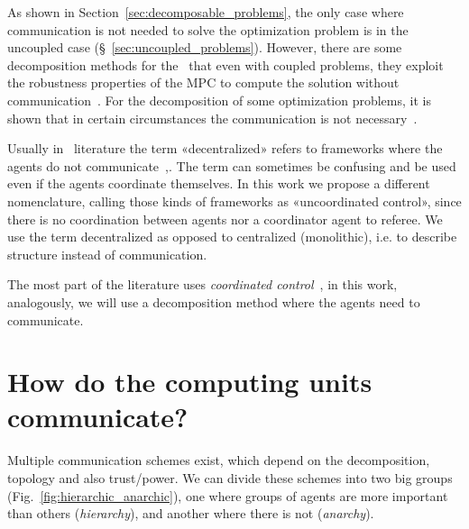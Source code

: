 \documentclass[../main.tex]{subfiles}
\begin{document}
As shown in Section~\ref{sec:decomposable_problems}, the only case where communication is not needed to solve the optimization problem is in the uncoupled case (\S~\ref{sec:uncoupled_problems}).
However, there are some decomposition methods for the \dmpc\ that even with coupled problems, they exploit the robustness properties of the MPC to compute the solution without communication~\cite{VahidNaghaviEtAl2014}.
For the decomposition of some optimization problems, it is shown that in certain circumstances the communication is not necessary~\cite{VoulgarisElia2022}.
\begin{remark}
  Usually in \dmpc\ literature the term «decentralized» refers to frameworks where the agents do not communicate~\cite[\S 4]{ChristofidesEtAl2013},\cite{NegenbornMaestre2014}.
  The term can sometimes be confusing and be used even if the agents coordinate themselves.
  In this work we propose a different nomenclature, calling those kinds of frameworks as «uncoordinated control», since there is no coordination between agents nor a coordinator agent to referee. We use the term decentralized as opposed to centralized (monolithic), i.e. to describe structure instead of communication.
\end{remark}

The most part of the literature uses \emph{coordinated control}~\cite{NegenbornMaestre2014, ArauzEtAl2021}, in this work, analogously, we will use a decomposition method where the agents need to communicate.


\section{How do the computing units communicate?}

Multiple communication schemes exist, which depend on the decomposition, topology and also trust/power.
We can divide these schemes into two big groups (Fig.~\ref{fig:hierarchic_anarchic}), one where groups of agents are more important than others (\emph{hierarchy}), and another where there is not (\emph{anarchy}).
\end{document}
